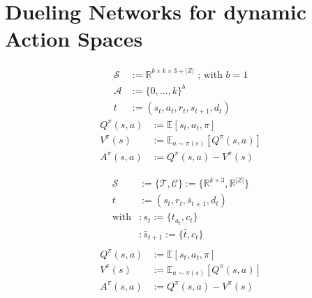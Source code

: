 \documentclass[]{article}
\begin{document}
\section{Dueling Networks for dynamic Action Spaces}
\begin{minipage}{0.49\linewidth}
	\begin{align*}
		\mathcal{S} &:= \mathbb{R}^{b \times k \times 3+|Z|} \text{ ; with } b=1 \\
		\mathcal{A} &:= \{ 0, \ldots, k \}^b \\
		t &:= (s_t, a_t, r_t, s_{t+1}, d_t)
	\end{align*}
	\begin{align*}
		Q^\pi(s, a) &:= \mathbb{E}[s_t, a_t, \pi] \\
		V^\pi(s) &:= \mathbb{E}_{a \sim \pi(s)}[Q^\pi(s, a)] \\
		A^\pi(s, a) &:= Q^\pi(s, a) - V^\pi(s)
	\end{align*}
\end{minipage}
\begin{minipage}{0.49\linewidth}
	\begin{align*}
		\mathcal{S} &:= \{ \mathcal{T}, \mathcal{C} \}:= \{ \mathbb{R}^{k \times 3}, \mathbb{R}^{|Z|} \}  \\
		t &:= (s_t, r_t, \bar{s}_{t+1}, d_t) \\
		\text{with} &: s_t := \{ t_{a_t}, c_t \} \\
		 &: \bar{s}_{t+1} := \{ \bar{t}, c_t \} \\
	\end{align*}
	\begin{align*}
		Q^\pi(s, a) &:= \mathbb{E}[s_t, a_t, \pi] \\
		V^\pi(s) &:= \mathbb{E}_{a \sim \pi(s)}[Q^\pi(s, a)] \\
		A^\pi(s, a) &:= Q^\pi(s, a) - V^\pi(s)
	\end{align*}
\end{minipage}




 
\end{document}
